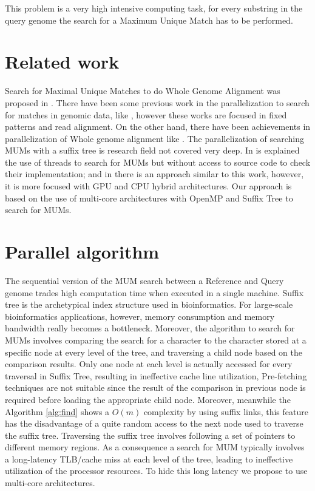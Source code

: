 \documentclass[conference]{IEEEtran}
\begin{document}
This problem is a very high intensive computing task, for every substring in the query genome the search for a Maximum Unique Match has to be performed.
\section{Related work}
Search for Maximal Unique Matches to do Whole Genome Alignment was proposed in \cite{Delcher1999}. There have been some previous work in the parallelization to search for matches in genomic data, like \cite{OguzhanKulekci2011,Mongelli,Kouzinopoulos2005}, however these works are focused in fixed patterns and read alignment. On the other hand, there have been achievements in parallelization of Whole genome alignment like \cite{Meng2005}. The parallelization of searching MUMs with a suffix tree is research field not covered very deep. In \cite{Encarnac2011} is explained the use of threads to search for MUMs but without access to source code to check their implementation; and in \cite{Schatz2007} there is an approach similar to this work, however, it is more focused with GPU and CPU hybrid architectures. Our approach is based on the use of multi-core architectures with OpenMP and Suffix Tree to search for MUMs.
\section{Parallel algorithm}  
The sequential version of the MUM search between a Reference and Query genome trades high computation time when executed in a single machine. Suffix tree is the archetypical index structure used in bioinformatics. For large-scale bioinformatics applications, however, memory consumption and memory bandwidth really becomes a bottleneck. Moreover, the algorithm to search for MUMs involves comparing the search for a character to the character stored at a specific node at every level of the tree, and traversing a child node based on the comparison results. Only one node at each level is actually accessed for every traversal in Suffix Tree, resulting in ineffective cache line utilization, Pre-fetching techniques are not suitable since the result of the comparison in previous node is required before loading the appropriate child node. Moreover, meanwhile the Algorithm \ref{alg:find} shows a $O(m)$ complexity by using suffix links, this feature has the disadvantage of a quite random access to the next node used to traverse the suffix tree. Traversing the suffix tree involves following a set of pointers to different memory regions. As a consequence a search for MUM typically involves a long-latency TLB/cache miss at each level of the tree, leading to ineffective utilization of the processor resources. To hide this long latency we propose to use multi-core architectures.
\end{document}
